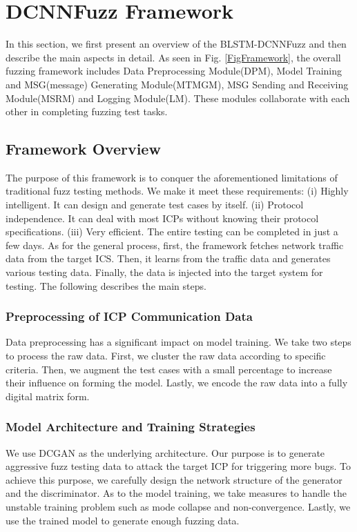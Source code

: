 

\section{DCNNFuzz Framework}
In this section, we first present an overview of the BLSTM-DCNNFuzz and then describe the main aspects in detail.  As seen in Fig. \ref{FigFramework}, the overall fuzzing framework includes Data Preprocessing Module(DPM), Model Training and MSG(message) Generating Module(MTMGM), MSG Sending and Receiving Module(MSRM) and Logging Module(LM). These modules collaborate with each other in completing fuzzing test tasks.



\subsection{Framework Overview}
The purpose of this framework is to conquer the aforementioned limitations of traditional fuzz testing methods. We make it meet these requirements: (i) Highly intelligent. It can design and generate test cases by itself. (ii) Protocol independence. It can deal with most ICPs without knowing their protocol specifications. (iii) Very efficient. The entire testing can be completed in just a few days. As for the general process, first, the framework fetches network traffic data from the target ICS. Then, it learns from the traffic data and generates various testing data. Finally, the data is injected into the target system for testing. The following describes the main steps.

\subsubsection{Preprocessing of ICP Communication Data}
Data preprocessing has a significant impact on model training. We take two steps to process the raw data. First, we cluster the raw data according to specific criteria. Then, we augment the test cases with a small percentage to increase their influence on forming the model. Lastly, we encode the raw data into a fully digital matrix form.

\subsubsection{Model Architecture and Training Strategies}
We use DCGAN as the underlying architecture. Our purpose is to generate aggressive fuzz testing data to attack the target ICP for triggering more bugs. To achieve this purpose, we carefully design the network structure of the generator and the discriminator. As to the model training, we take measures to handle the unstable training problem such as mode collapse and non-convergence. Lastly, we use the trained model to generate enough fuzzing data.

